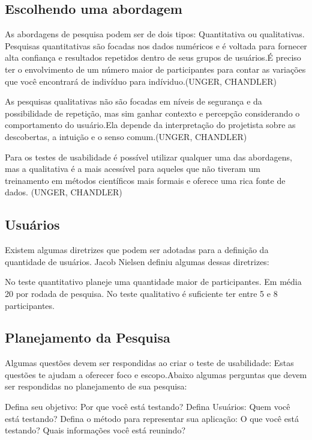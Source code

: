 \subsection{Escolhendo uma abordagem}

As abordagens de pesquisa podem ser de dois tipos: Quantitativa ou qualitativas. 
Pesquisas quantitativas são focadas nos dados numéricos e é voltada para fornecer alta confiança e resultados repetidos dentro de seus grupos de usuários.É preciso ter o envolvimento de um número maior de participantes para contar as variações que você encontrará de indivíduo para indíviduo.(UNGER, CHANDLER)

As pesquisas qualitativas não são focadas em níveis de segurança e da possibilidade de repetição, mas sim ganhar contexto e percepção considerando o comportamento do usuário.Ela depende da interpretação do projetista sobre as descobertas, a intuição e o senso comum.(UNGER, CHANDLER)

Para os testes de usabilidade é possível utilizar qualquer uma das abordagens, mas a qualitativa é a mais acessível para aqueles que não tiveram um treinamento em métodos científicos mais formais e oferece uma rica fonte de dados. (UNGER, CHANDLER)


\subsection {Usuários}

Existem algumas diretrizes que podem ser adotadas para a definição da quantidade de usuários. Jacob Nielsen definiu algumas dessas diretrizes:

No teste quantitativo planeje uma quantidade maior de participantes. Em média 20 por rodada de pesquisa.
No teste qualitativo é suficiente ter entre 5 e 8 participantes.


\subsection {Planejamento da Pesquisa}

Algumas questões devem ser respondidas ao criar o teste de usabilidade: Estas questões te ajudam a oferecer foco e escopo.Abaixo algumas perguntas que devem ser respondidas no planejamento de sua pesquisa:

Defina seu objetivo: Por que você está testando? %
Defina Usuários: Quem você está testando? %
Defina o método para representar sua aplicação: O que você está testando?
Quais informações você está reunindo? 


